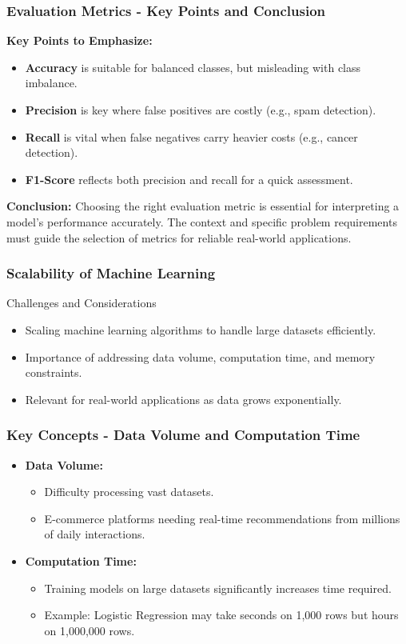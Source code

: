 \documentclass[aspectratio=169]{beamer}
\begin{document}
\begin{frame}[fragile]
    \frametitle{Evaluation Metrics - Key Points and Conclusion}
    \textbf{Key Points to Emphasize:}
    \begin{itemize}
        \item \textbf{Accuracy} is suitable for balanced classes, but misleading with class imbalance.
        \item \textbf{Precision} is key where false positives are costly (e.g., spam detection).
        \item \textbf{Recall} is vital when false negatives carry heavier costs (e.g., cancer detection).
        \item \textbf{F1-Score} reflects both precision and recall for a quick assessment.
    \end{itemize}

    \textbf{Conclusion:} 
    Choosing the right evaluation metric is essential for interpreting a model's performance accurately. The context and specific problem requirements must guide the selection of metrics for reliable real-world applications.
\end{frame}

\begin{frame}
    \frametitle{Scalability of Machine Learning}
    \begin{block}{Challenges and Considerations}
        \begin{itemize}
            \item Scaling machine learning algorithms to handle large datasets efficiently.
            \item Importance of addressing data volume, computation time, and memory constraints.
            \item Relevant for real-world applications as data grows exponentially.
        \end{itemize}
    \end{block}
\end{frame}

\begin{frame}
    \frametitle{Key Concepts - Data Volume and Computation Time}
    \begin{itemize}
        \item \textbf{Data Volume:}
          \begin{itemize}
              \item Difficulty processing vast datasets.
              \item E-commerce platforms needing real-time recommendations from millions of daily interactions.
          \end{itemize}
        \item \textbf{Computation Time:}
          \begin{itemize}
              \item Training models on large datasets significantly increases time required.
              \item Example: Logistic Regression may take seconds on 1,000 rows but hours on 1,000,000 rows.
          \end{itemize}
    \end{itemize}
\end{frame}
\end{document}
